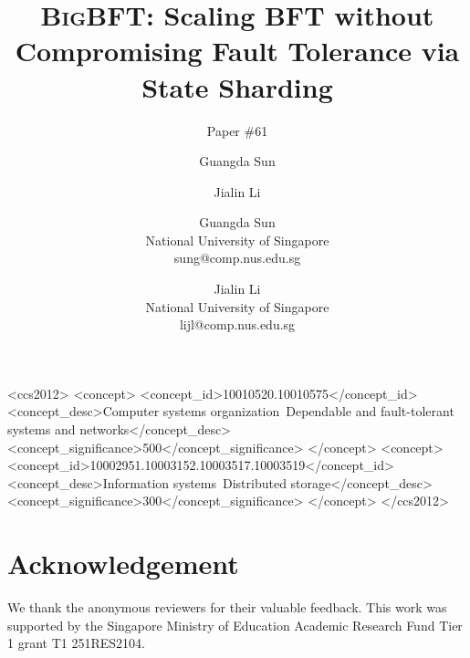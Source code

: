 \documentclass[sigconf,10pt]{acmart}
\title{\sys}
\title{\textsc{BigBFT}: Scaling BFT without Compromising Fault Tolerance via State Sharding}
\author{\small Paper \#61}
\author{Guangda Sun}
\affiliation{
    \institution{National University of Singapore}
    \city{}
    \country{}
}
\author{Jialin Li}
\affiliation{
    \institution{National University of Singapore}
    \city{}
    \country{}
}
\author{
{\rm Guangda Sun}\\
National University of Singapore\\
sung@comp.nus.edu.sg
\and
{\rm Jialin Li}\\
National University of Singapore\\
lijl@comp.nus.edu.sg
}
\begin{document}


\begin{CCSXML}
<ccs2012>
<concept>
<concept_id>10010520.10010575</concept_id>
<concept_desc>Computer systems organization~Dependable and fault-tolerant systems and networks</concept_desc>
<concept_significance>500</concept_significance>
</concept>
<concept>
<concept_id>10002951.10003152.10003517.10003519</concept_id>
<concept_desc>Information systems~Distributed storage</concept_desc>
<concept_significance>300</concept_significance>
</concept>
</ccs2012>
\end{CCSXML}



\maketitle %








\section*{Acknowledgement}
We thank the anonymous reviewers for their valuable feedback.
This work was supported by the Singapore Ministry of Education Academic Research Fund Tier 1 grant T1 251RES2104.

\ifacm

\else

\fi

\end{document}
